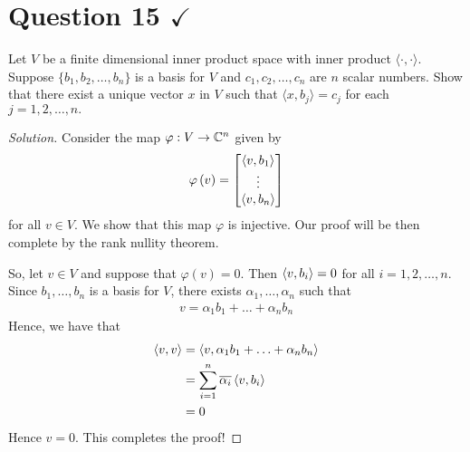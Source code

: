 \section{Question 15 \texorpdfstring{$\checkmark$}{}}
\horz
Let $V$ be a finite dimensional inner product space with inner product $\langle\cdot ,\cdot \rangle.$ Suppose $\{b_1,b_2,\ldots,b_n\}$ is a basis for $V$ and $c_1,c_2,\ldots,c_n$ are $n$  scalar numbers. Show that there exist a unique vector $x$ in $V$ such that $\langle x , b_j \rangle = c_j$ for each $j=1,2,\ldots,n.$ 
\horz
\begin{proof}[Solution]
Consider the map $\varphi : V \to \mathbb C ^{n}$ given by 
\begin{align*}
    \varphi \left( v \right)
    =
    \begin{bmatrix}
	\left\langle v, b_{1} \right\rangle \\
	\vdots \\
	\left\langle v, b_{n} \right\rangle
    \end{bmatrix}
\end{align*}
for all $v\in V$. We show that this map $\varphi$ is injective. Our proof will be then complete by the rank nullity theorem.

So, let $v\in V$ and suppose that $\varphi \left( v \right) = 0$. Then $\left\langle v, b_{i} \right\rangle = 0$ for all $i=1,2, \ldots,  n$. Since $b_{1} , \ldots , b_{n}$ is a basis for $V$, there exists $\alpha _{1} , \ldots , \alpha _{n}$ such that
\begin{align*}
    v= \alpha_{1} b_{1} + \ldots + \alpha _{n} b_{n}
\end{align*}
Hence, we have that 
\begin{align*}
    \left\langle v, v \right\rangle &= \left\langle v, \alpha_{1} b_{1} + \ldots + \alpha _{n} b_{n}  \right\rangle \\
    &= \sum_{i=1}^{n} \overline{\alpha_{i}} \left\langle v, b_{i} \right\rangle \\
    &= 0
\end{align*}
Hence $v=0$. This completes the proof!
\end{proof}
